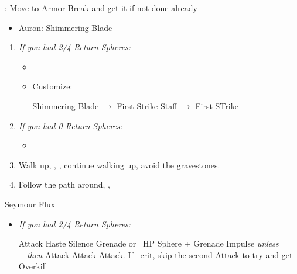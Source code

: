 \begin{spheregrid}
\begin{multicols}{2}
\begin{itemize}
\begin{itemize}
      \end{itemize}
      \tidusf: Move to Armor Break and get it if not done already
    \end{itemize}
  \end{multicols}
\end{spheregrid}
\begin{multicols}{2}
\begin{equip}
  \begin{itemize}
    \item Auron: Shimmering Blade
  \end{itemize}
\end{equip}
\begin{enumerate}[resume]
  \item \textit{If you had 2/4 Return Spheres:}
        \begin{itemize}
          \item \formation{\tidus}{\yuna}{\auron}
          \item Customize:
                \begin{itemize}
                  \auronf Shimmering Blade $\rightarrow$ First Strike
                  \yunaf Staff $\rightarrow$ First STrike
                \end{itemize}
        \end{itemize}
  \item \textit{If you had 0 Return Spheres:}
        \begin{itemize}
          \item \formation{\tidus}{\kimahri}{\auron}
        \end{itemize}
  \item Walk up, \sd, \cs[1:20], continue walking up, avoid the gravestones.
  \item Follow the path around, \save, \sd
\end{enumerate}
\vfill
\begin{battle}[70000]{Seymour Flux}
  \begin{itemize}
    \item \textit{If you had 2/4 Return Spheres:}
          \begin{itemize}
            \yunaf Attack
            \tidusf Haste \yuna
            \switch{\auron}{\rikku}
            \rikkuf Silence Grenade or \od\ HP Sphere + Grenade
            \summon{\bahamut}
            \bahamutf Impulse \textit{unless \rikku\ \od\ then } Attack
            \yunaf Attack
            \tidusf Attack. If \yuna\ crit, skip the second Attack to try and get Overkill
          \end{itemize}

\end{itemize}
\end{battle}
\end{multicols}
